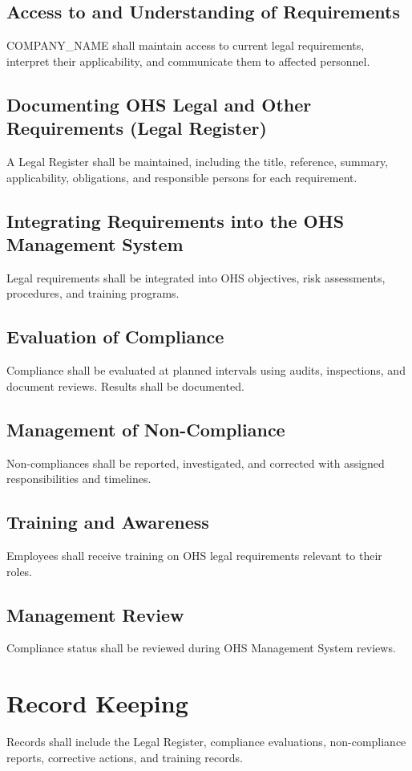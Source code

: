 \documentclass[12pt]{article}
\begin{document}
\subsection{Access to and Understanding of Requirements}
{{COMPANY_NAME}} shall maintain access to current legal requirements, interpret their applicability, and communicate them to affected personnel.

\subsection{Documenting OHS Legal and Other Requirements (Legal Register)}
A Legal Register shall be maintained, including the title, reference, summary, applicability, obligations, and responsible persons for each requirement.

\subsection{Integrating Requirements into the OHS Management System}
Legal requirements shall be integrated into OHS objectives, risk assessments, procedures, and training programs.

\subsection{Evaluation of Compliance}
Compliance shall be evaluated at planned intervals using audits, inspections, and document reviews. Results shall be documented.

\subsection{Management of Non-Compliance}
Non-compliances shall be reported, investigated, and corrected with assigned responsibilities and timelines.

\subsection{Training and Awareness}
Employees shall receive training on OHS legal requirements relevant to their roles.

\subsection{Management Review}
Compliance status shall be reviewed during OHS Management System reviews.

\section{Record Keeping}
Records shall include the Legal Register, compliance evaluations, non-compliance reports, corrective actions, and training records.
\end{document}
